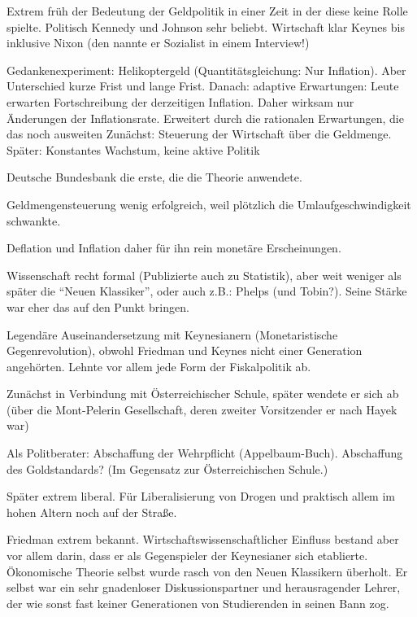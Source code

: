 Extrem früh der Bedeutung der Geldpolitik in einer Zeit in der diese keine Rolle spielte. Politisch Kennedy und Johnson sehr beliebt. Wirtschaft klar Keynes bis inklusive Nixon (den nannte er Sozialist in einem Interview!)



Gedankenexperiment: Helikoptergeld (Quantitätsgleichung: Nur Inflation). Aber Unterschied kurze Frist und lange Frist.
Danach: adaptive Erwartungen: Leute erwarten Fortschreibung der derzeitigen Inflation. Daher wirksam nur Änderungen der Inflationsrate. Erweitert durch die rationalen Erwartungen, die das noch ausweiten
Zunächst: Steuerung der Wirtschaft über die Geldmenge. Später: Konstantes Wachstum, keine aktive Politik

Deutsche Bundesbank die erste, die die Theorie anwendete.

Geldmengensteuerung wenig erfolgreich, weil plötzlich die Umlaufgeschwindigkeit schwankte.

Deflation und Inflation daher für ihn rein monetäre Erscheinungen.


Wissenschaft recht formal (Publizierte auch zu Statistik), aber weit weniger als später die "`Neuen Klassiker"', oder auch z.B.: Phelps (und Tobin?). Seine Stärke war eher das auf den Punkt bringen.

Legendäre Auseinandersetzung mit Keynesianern (Monetaristische Gegenrevolution), obwohl Friedman und Keynes nicht einer Generation angehörten. Lehnte vor allem jede Form der Fiskalpolitik ab.










Zunächst in Verbindung mit Österreichischer Schule, später wendete er sich ab (über die Mont-Pelerin Gesellschaft, deren zweiter Vorsitzender er nach Hayek war)


Als Politberater: Abschaffung der Wehrpflicht (Appelbaum-Buch). Abschaffung des Goldstandards? (Im Gegensatz zur Österreichischen Schule.)




Später extrem liberal. Für Liberalisierung von Drogen und praktisch allem im hohen Altern noch auf der Straße.

Friedman extrem bekannt. Wirtschaftswissenschaftlicher Einfluss bestand aber vor allem darin, dass er als Gegenspieler der Keynesianer sich etablierte. Ökonomische Theorie selbst wurde rasch von den Neuen Klassikern überholt. Er selbst war ein sehr gnadenloser Diskussionspartner und herausragender Lehrer, der wie sonst fast keiner Generationen von Studierenden in seinen Bann zog. 




